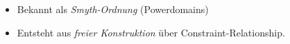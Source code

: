 \begin{frame}
\begin{itemize}
\item Bekannt als \emph{Smyth-Ordnung} (Powerdomains) \hfill \cite[Ch.~9]{amadio-curien:1998}
\item Entsteht aus \emph{freier Konstruktion} über Constraint-Relationship.\hfill \cite{knapp-schiendorfer2014ictai}
\end{itemize}

%

\end{frame}

